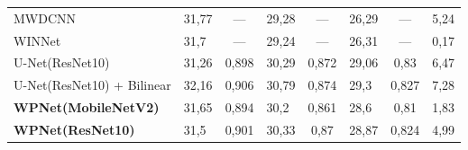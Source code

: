 \begin{table}
\begin{center}
\begin{tabular}{|l|l|c|l|c|l|c|c|}


 MWDCNN~\cite{MDIWT} & 31,77 & --- & 29,28 & --- & 26,29 & --- & 5,24 \\ 




 WINNet~\cite{WINNet} & 31,7 & --- & 29,24 & --- & 26,31 & --- & 0,17 \\ 




 U-Net(ResNet10) & 31,26 & 0,898 & 30,29 & 0,872 & 29,06 & 0,83\hphantom{9} & 6,47 \\ 




 U-Net(ResNet10) + Bilinear & 32,16 & 0,906 & 30,79 & 0,874 & 29,3 & 0,827 & 7,28 \\ 




 \textbf{WPNet(MobileNetV2)} & 31,65 & 0,894 & 30,2 & 0,861 & 28,6 & 0,81\hphantom{9} & 1,83 \\ 




 \textbf{WPNet(ResNet10)} & 31,5 & 0,901 & 30,33 & 0,87\hphantom{9} & 28,87 & 0,824 & 4,99 \\ 


 \hline


\end{tabular}


\end{center}






\begin{center}


\parbox{330pt}{


}





\label{tab:comparison_sidd}


\vspace*{2ex}





\begin{tabular}{|l|l|l|l|l|c| }


 \hline



\end{tabular}
\end{center}
\end{table}
